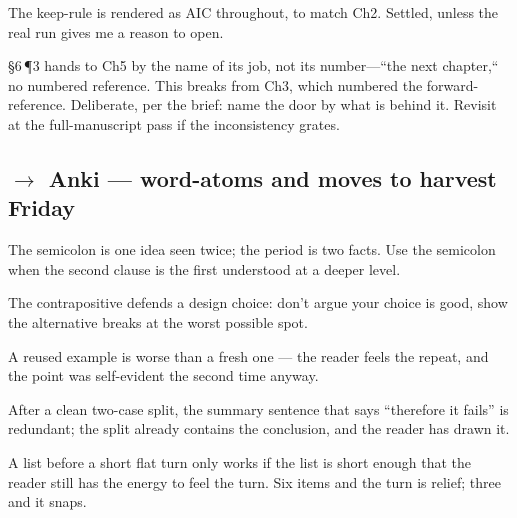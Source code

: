 The keep-rule is rendered as AIC throughout, to match Ch2. Settled, unless the real run gives me a reason to open. 

\S6\,\P3 hands to Ch5 by the name of its job, not its number---``the next chapter,`` no numbered reference. This breaks from Ch3, which numbered the forward-reference. Deliberate, per the brief: name the door by what is behind it. Revisit at the full-manuscript pass if the inconsistency grates.

\subsection*{$\rightarrow$ Anki --- word-atoms and moves to harvest Friday}
 
The semicolon is one idea seen twice; the period is two facts. Use the
semicolon when the second clause is the first understood at a deeper
level.
 
The contrapositive defends a design choice: don't argue your choice is
good, show the alternative breaks at the worst possible spot.
 
A reused example is worse than a fresh one --- the reader feels the
repeat, and the point was self-evident the second time anyway.
 
After a clean two-case split, the summary sentence that says ``therefore
it fails'' is redundant; the split already contains the conclusion, and
the reader has drawn it.
 
A list before a short flat turn only works if the list is short enough
that the reader still has the energy to feel the turn. Six items and the
turn is relief; three and it snaps.